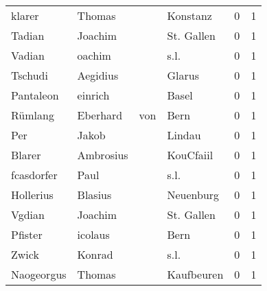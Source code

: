 \begin{tabular}{llllrr}
                   klarer &                             Thomas &             &                                    Konstanz &          0 &         1 \\
                   Tadian &                            Joachim &             &                                  St. Gallen &          0 &         1 \\
                   Vadian &                             oachim &             &                                        s.l. &          0 &         1 \\
                  Tschudi &                           Aegidius &             &                                      Glarus &          0 &         1 \\
                Pantaleon &                            einrich &             &                                       Basel &          0 &         1 \\
                  Rümlang &                           Eberhard &         von &                                        Bern &          0 &         1 \\
                      Per &                              Jakob &             &                                      Lindau &          0 &         1 \\
                   Blarer &                          Ambrosius &             &                                   KouCfaiil &          0 &         1 \\
               fcasdorfer &                               Paul &             &                                        s.l. &          0 &         1 \\
                Hollerius &                            Blasius &             &                                   Neuenburg &          0 &         1 \\
                   Vgdian &                            Joachim &             &                                  St. Gallen &          0 &         1 \\
                  Pfister &                            icolaus &             &                                        Bern &          0 &         1 \\
                    Zwick &                             Konrad &             &                                        s.l. &          0 &         1 \\
               Naogeorgus &                             Thomas &             &                                  Kaufbeuren &          0 &         1 \\

\end{tabular}

